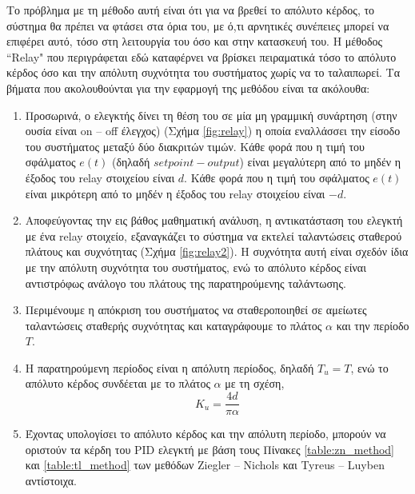 Το πρόβλημα με τη μέθοδο αυτή είναι ότι για να βρεθεί το απόλυτο κέρδος, το σύστημα θα πρέπει να φτάσει στα όρια του, με ό,τι αρνητικές συνέπειες μπορεί να επιφέρει αυτό, τόσο στη λειτουργία του όσο και στην κατασκευή του. Η μέθοδος ``Relay" που περιγράφεται εδώ καταφέρνει να βρίσκει πειραματικά τόσο το απόλυτο κέρδος όσο και την απόλυτη συχνότητα του συστήματος χωρίς να το ταλαιπωρεί. Τα βήματα που ακολουθούνται για την εφαρμογή της μεθόδου είναι τα ακόλουθα:
\begin{enumerate}

\item Προσωρινά, ο ελεγκτής δίνει τη θέση του σε μία μη γραμμική συνάρτηση (στην ουσία είναι on -- off	έλεγχος) (Σχήμα \ref{fig:relay}) η οποία εναλλάσσει την είσοδο του συστήματος μεταξύ δύο διακριτών τιμών. Κάθε φορά που η τιμή του σφάλματος $e(t)$ (δηλαδή $setpoint - output$) είναι μεγαλύτερη από το μηδέν η έξοδος του relay στοιχείου είναι $d$. Κάθε φορά που η τιμή του σφάλματος $e(t)$ είναι μικρότερη από το μηδέν η έξοδος του relay στοιχείου είναι $-d$.

\item Αποφεύγοντας την εις βάθος μαθηματική ανάλυση, 
η αντικατάσταση του ελεγκτή με ένα relay στοιχείο, εξαναγκάζει το σύστημα να εκτελεί ταλαντώσεις σταθερού πλάτους και συχνότητας (Σχήμα \ref{fig:relay2}). Η συχνότητα αυτή είναι σχεδόν ίδια με την απόλυτη συχνότητα του συστήματος, ενώ το απόλυτο κέρδος είναι αντιστρόφως ανάλογο του πλάτους της παρατηρούμενης ταλάντωσης.

\item Περιμένουμε η απόκριση του συστήματος να σταθεροποιηθεί σε αμείωτες ταλαντώσεις σταθερής συχνότητας και καταγράφουμε το πλάτος $\alpha$ και την περίοδο $T$.
 
\item Η παρατηρούμενη περίοδος είναι η απόλυτη περίοδος, δηλαδή $T_u=T$, ενώ το απόλυτο κέρδος συνδέεται με το πλάτος $\alpha$ με τη σχέση,
\begin{equation}
K_u = \frac{4d}{\pi\alpha}
\label{eq:Ku}
\end{equation}

\item Έχοντας υπολογίσει το απόλυτο κέρδος και την απόλυτη περίοδο, μπορούν να οριστούν τα κέρδη του PID ελεγκτή με βάση τους Πίνακες \ref{table:zn_method} και \ref{table:tl_method} των μεθόδων Ziegler -- Nichols και Tyreus -- Luyben αντίστοιχα.

\end{enumerate}

